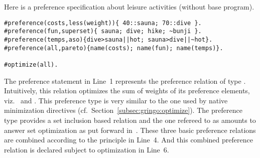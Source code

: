 \begin{example}
\label{asprin:example3} 
Here is %
a {preference specification} about leisure activities (without base program).
\begin{lstlisting}[escapechar=?]
#preference(costs,less(weight)){ 40::sauna; 70::dive }.
#preference(fun,superset){ sauna; dive; hike; ~bunji }.
#preference(temps,aso){dive>sauna||hot; sauna>dive||~hot}.
#preference(all,pareto){name(costs); name(fun); name(temps)}.

#optimize(all).
\end{lstlisting}
The preference statement in Line~1 represents the preference relation  of type .
Intuitively, this relation optimizes the sum of weights of its preference elements, 
viz.\  and .
This preference type is very similar to the one used by native minimization directives (cf.\ Section~\ref{subsec:gringo:optimize}).
The preference type  provides a set inclusion based relation and the one refereed to as 
amounts to answer set optimization as put forward in~\cite{brnitr03a}.
These three basic preference relations are combined according to the  principle in Line~4.
And this combined preference relation is declared subject to optimization in Line~6.
\end{example}
%

